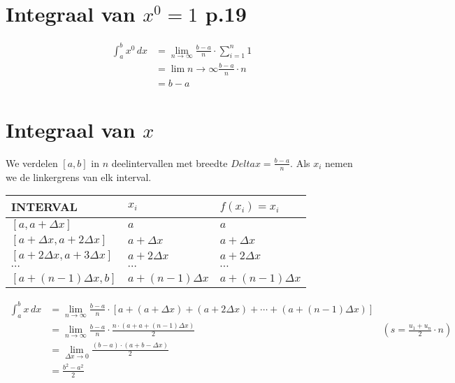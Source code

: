 \documentclass{article}
\begin{document}
\section{Integraal van $x^0 = 1$ p.19}
\begin{align*}
  \displaystyle\int_{a}^{b} x^0 \, dx &= \lim_{n\to\infty} \frac{b-a}{n}\cdot\sum_{i=1}^{n}1\\
                                     &=\lim{n\to\infty}\frac{b-a}{n}\cdot n\\
                                     &=b-a
\end{align*}
\section{Integraal van $x$}
We verdelen $[a,b]$ in $n$ deelintervallen met breedte $Delta x = \frac{b-a}{n}.$ Als $x_i$ nemen we de linkergrens van elk interval. 
\begin{center}
  \begin{tabularx}{\textwidth}{| >{\centering\arraybackslash}X | >{\centering\arraybackslash}X | >{\centering\arraybackslash}X|}
    \hline
    INTERVAL & $x_i$ & $f\left(x_i\right) = x_i$\\
    \hline
    \hline
    $\left[a, a+\Delta x\right]$ & $a$ & $a$\\
   \hline
    $\left[a + \Delta x, a+2\Delta x\right]$ & $a+\Delta x$ & $a+\Delta x$\\
    \hline
    $\left[a + 2\Delta x, a+3\Delta x\right]$ & $a+2\Delta x$ & $a+2\Delta x$\\
    \hline
    $\cdots$ &$\cdots$ &$\cdots$\\
    \hline
    $\left[a + \left(n-1\right)\Delta x, b\right]$ & $a+\left(n-1\right)\Delta x$ & $a+\left(n-1\right)\Delta x$\\
    \hline
  \end{tabularx}
\end{center}


\begin{align*}
  \displaystyle\int_{a}^{b}x\,dx &=\lim_{n\to\infty} \frac{b-a}{n}\cdot\left[a+\left(a+\Delta x\right) + \left(a+2\Delta x\right) + \cdots + \left(a+\left(n-1\right)\Delta x\right)\right]\\
                                 &=\lim_{n\to\infty}\frac{b-a}{n}\cdot\frac{n\cdot\left(a+a+\left(n-1\right)\Delta x\right)}{2} &\left(s=\frac{u_1+u_n}{2}\cdot n\right)\\
                                 &=\lim_{\Delta x\to 0}\frac{\left(b-a\right)\cdot\left(a+b-\Delta x\right)}{2}\\
                                 &=\frac{b^2-a^2}{2}
\end{align*}
\end{document}
